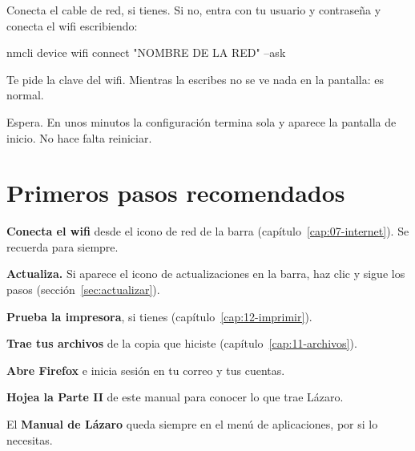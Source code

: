 \begin{pasos}
  \item Conecta el cable de red, si tienes. Si no, entra con tu usuario y
        contraseña y conecta el wifi escribiendo:
\begin{terminal}
nmcli device wifi connect "NOMBRE DE LA RED" --ask
\end{terminal}
        Te pide la clave del wifi. Mientras la escribes no se ve nada en la
        pantalla: es normal.
  \item Espera. En unos minutos la configuración termina sola y aparece la
        pantalla de inicio. No hace falta reiniciar.
\end{pasos}

\section{Primeros pasos recomendados}

\begin{pasos}
  \item \textbf{Conecta el wifi} desde el icono de red de la barra
        (capítulo~\ref{cap:07-internet}). Se recuerda para siempre.
  \item \textbf{Actualiza.} Si aparece el icono de actualizaciones en la
        barra, haz clic y sigue los pasos (sección~\ref{sec:actualizar}).
  \item \textbf{Prueba la impresora}, si tienes (capítulo~\ref{cap:12-imprimir}).
  \item \textbf{Trae tus archivos} de la copia que hiciste
        (capítulo~\ref{cap:11-archivos}).
  \item \textbf{Abre Firefox} e inicia sesión en tu correo y tus cuentas.
  \item \textbf{Hojea la Parte II} de este manual para conocer lo que
        trae Lázaro.
\end{pasos}

El \textbf{Manual de Lázaro} queda siempre en el menú de aplicaciones, por
si lo necesitas.

\fuentes
